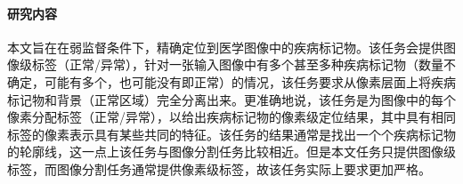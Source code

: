 \paragraph{研究内容} 本文旨在在弱监督条件下，精确定位到医学图像中的疾病标记物。该任务会提供图像级标签（正常/异常），针对一张输入图像中有多个甚至多种疾病标记物（数量不确定，可能有多个，也可能没有即正常）的情况，该任务要求从像素层面上将疾病标记物和背景（正常区域）完全分离出来。更准确地说，该任务是为图像中的每个像素分配标签（正常/异常），以给出疾病标记物的像素级定位结果，其中具有相同标签的像素表示具有某些共同的特征。该任务的结果通常是找出一个个疾病标记物的轮廓线，这一点上该任务与图像分割任务比较相近。但是本文任务只提供图像级标签，而图像分割任务通常提供像素级标签，故该任务实际上要求更加严格。

